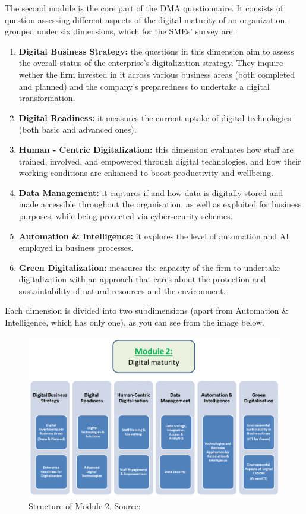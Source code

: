 \documentclass[12pt]{report}
\begin{document}
\par The second module is the core part of the DMA questionnaire. It consists of question assessing different aspects of the digital maturity of an organization, grouped under six dimensions, which for the SMEs' survey are:

\begin{enumerate}
    \item \textbf{Digital Business Strategy:} the questions in this dimension aim to assess the overall status of the enterprise's digitalization strategy. They inquire wether the firm invested in it across various business areas (both completed and planned) and the company's preparedness to undertake a digital transformation. 
    \item \textbf{Digital Readiness:} it measures the current uptake of digital technologies (both basic and advanced ones).
    \item \textbf{Human - Centric Digitalization:} this dimension evaluates how staff are trained, involved, and empowered through digital technologies, and how their working conditions are enhanced to boost productivity and wellbeing.
    \item \textbf{Data Management:} it captures if and how data is digitally stored and made accessible throughout the organisation, as well as exploited for business purposes, while being protected via cybersecurity schemes.
    \item \textbf{Automation \& Intelligence:} it explores the level of automation and AI employed in business processes.
    \item \textbf{Green Digitalization:} measures the capacity of the firm to undertake digitalization with an approach that cares about the protection and sustaintability of natural resources and the environment.
\end{enumerate}

\par Each dimension is divided into two subdimensions (apart from Automation \& Intelligence, which has only one), as you can see from the image below.

\begin{figure}[ht]
    \centering
    \includegraphics[width=1\textwidth]{Figures/03-dmamodule2structure.png}
    \caption{Structure of Module 2. Source: \cite{jrc_dmamanual}}
    \label{fig:dma_module2_survey_structure}
\end{figure}
\end{document}

